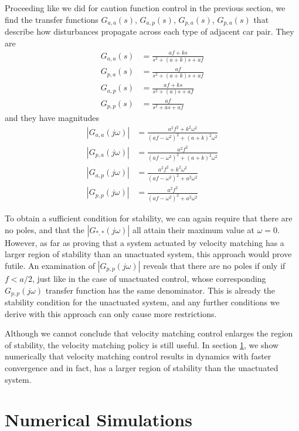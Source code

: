 \documentclass[10pt,twocolumn]{article}
\theoremstyle{ss}
\begin{document}
Proceeding like we did for caution function control in the previous section, we find the transfer functions $G_{a,a}(s)$, $G_{a,p}(s)$, $G_{p,a}(s)$, $G_{p,a}(s)$ that describe how disturbances propagate across each type of adjacent car pair. They are
\begin{align}
G_{a,a}(s) &= \frac{af + ks}{s^2 + (a+k)s + af}\\
G_{p,a}(s) &= \frac{af}{s^2 + (a+k)s + af}\\
G_{a,p}(s) &= \frac{af + ks}{s^2 + (a)s + af}\\
G_{p,p}(s) &= \frac{af}{s^2 + as + af}
\end{align}
and they have magnitudes
\begin{align}
|G_{a,a}(j\omega)| &= \frac{a^2f^2 + k^2\omega^2}{(af - \omega^2)^2 + (a+k)^2\omega^2}\\
|G_{p,a}(j\omega)| &= \frac{a^2f^2}{(af - \omega^2)^2 + (a+k)^2\omega^2}\\
|G_{a,p}(j\omega)| &= \frac{a^2f^2 + k^2\omega^2}{(af - \omega^2)^2 + a^2\omega^2}\\
|G_{p,p}(j\omega)| &= \frac{a^2f^2}{(af - \omega^2)^2 + a^2\omega^2}
\end{align}

To obtain a sufficient condition for stability, we can again require that there are no poles, and that the $|G_{*,*}(j\omega)|$ all attain their maximum value at $\omega=0$. However, as far as proving that a system actuated by velocity matching has a larger region of stability than an unactuated system, this approach would prove futile. An examination of $|G_{p,p}(j\omega)|$ reveals that there are no poles if only if $f < a/2$, just like in the case of unactuated control, whose corresponding $G_{p,p}(j\omega)$ transfer function has the same denominator. This is already the stability condition for the unactuated system, and any further conditions we derive with this approach can only cause more restrictions. 

Although we cannot conclude that velocity matching control enlarges the region of stability, the velocity matching policy is still useful. In section \ref{sec:numer}, we show numerically that velocity matching control results in dynamics with faster convergence and in fact, has a larger region of stability than the unactuated system.

\section{Numerical Simulations}
\label{sec:numer}
\end{document}
